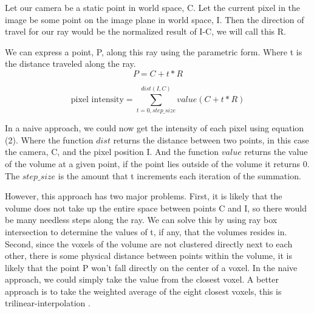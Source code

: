 \documentclass[12pt,twocolumn]{article}
\begin{document}
Let our camera be a static point in world space, C. 
Let the current pixel in the image be some point on the image plane in world space, I. 
Then the direction of travel for our ray would be the normalized result of I-C, we will call this R.

We can express a point, P, along this ray using the parametric form. Where t is the distance traveled along the ray.
\begin{equation}
  P = C + t * R
\end{equation}


\begin{equation}
  \text{pixel intensity} = \sum_{t=0,step\_size}^{dist(I,C)} value(C+t*R)
\end{equation}

In a naive approach, we could now get the intensity of each pixel using equation (2).
Where the function $dist$ returns the distance between two points, in this case the camera, C, and the pixel position I.
And the function $value$ returns the value of the volume at a given point, if the point lies outside of the volume it 
returns 0.
The $step\_size$ is the amount that t increments each iteration of the summation.

However, this approach has two major problems. 
First, it is likely that the volume does not take up the entire space between 
points C and I, so there would be many needless steps along the ray. We can solve this by using ray box intersection
to determine the values of t, if any, that the volumes resides in. Second, since the voxels of the volume are not 
clustered directly next to each other, there is some physical distance between points within the volume, it is likely 
that the point P won't fall directly on the center of a voxel. In the naive approach, we could simply take the value 
from the closest voxel. A better approach is to take the weighted average of the eight closest voxels, this is 
trilinear-interpolation \cite{Yoder_2003}.
\end{document}
